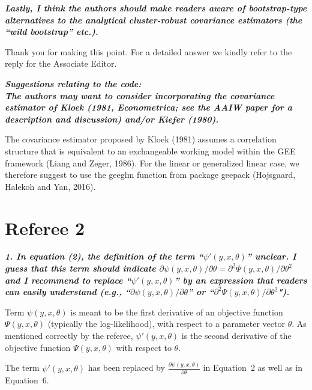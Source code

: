 \documentclass[10pt,a4paper]{article}
\begin{document}
\medskip

\textbf{\textit{Lastly, I think the authors should make readers aware of bootstrap-type alternatives to the analytical cluster-robust covariance estimators (the ``wild bootstrap'' etc.).}}

\medskip

Thank you for making this point. For a detailed answer we kindly refer to the reply for the Associate Editor. 

\medskip

\textbf{\textit{Suggestions relating to the code:
\\
The authors may want to consider incorporating the  covariance estimator of Kloek (1981, Econometrica; see the AAIW paper for a description and discussion) and/or Kiefer (1980).}}

\medskip

The covariance estimator proposed by Kloek (1981) assumes a correlation structure that is equivalent to an exchangeable working model within the GEE framework (Liang and Zeger, 1986).
For the linear or generalized linear case, we therefore suggest to use the geeglm function from package geepack (Hojsgaard, Halekoh and Yan, 2016).

\section*{Referee 2}

\textbf{\textit{1. In equation (2), the definition of the term ``$\psi'(y, x, \theta)$'' unclear.
I guess that this term should indicate $\partial \psi(y, x, \theta)/\partial\theta = \partial^2\Psi(y, x, \theta)/\partial\theta^2$ and I recommend to replace ``$\psi'(y, x, \theta)$''
by an expression that readers can easily understand
(e.g., ``$\partial \psi(y, x, \theta)/\partial\theta$'' or ``$\partial^2\Psi(y, x, \theta)/\partial\theta^2$").}}

\medskip

Term $\psi(y, x, \theta)$ is meant to be the first derivative of an objective function $\Psi(y, x, \theta)$ (typically the log-likelihood), with respect to a parameter vector $\theta$. As mentioned correctly by the referee, $\psi'(y, x, \theta)$ is the second derivative of the objective function $\Psi(y, x, \theta)$ with respect to $\theta$.

The term $\psi'(y, x, \theta)$ has been replaced by $\frac{\partial \psi(y, x, \theta)}{\partial\theta}$ in Equation~2 as well as in Equation~6.
\end{document}
